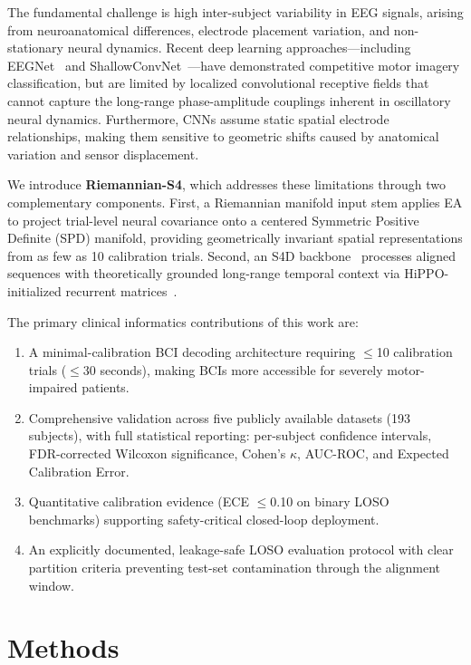 \documentclass[11pt,a4paper]{article}
\begin{document}
The fundamental challenge is high inter-subject variability in EEG signals,
arising from neuroanatomical differences, electrode placement variation, and
non-stationary neural dynamics.
Recent deep learning approaches---including EEGNet~\cite{Lawhern2018} and
ShallowConvNet~\cite{Schirrmeister2017}---have demonstrated competitive motor
imagery classification, but are limited by localized convolutional receptive
fields that cannot capture the long-range phase-amplitude couplings inherent
in oscillatory neural dynamics.
Furthermore, CNNs assume static spatial electrode relationships, making them
sensitive to geometric shifts caused by anatomical variation and sensor
displacement.

We introduce \textbf{Riemannian-S4}, which addresses these limitations through
two complementary components.
First, a Riemannian manifold input stem applies EA to project trial-level
neural covariance onto a centered Symmetric Positive Definite (SPD) manifold,
providing geometrically invariant spatial representations from as few as 10
calibration trials.
Second, an S4D backbone~\cite{Gu2022} processes aligned sequences with
theoretically grounded long-range temporal context via HiPPO-initialized
recurrent matrices~\cite{Gu2021}.

The primary clinical informatics contributions of this work are:
\begin{enumerate}
    \item A minimal-calibration BCI decoding architecture requiring $\leq$10
          calibration trials ($\leq$30 seconds), making BCIs more accessible for
          severely motor-impaired patients.
    \item Comprehensive validation across five publicly available datasets
          (193 subjects), with full statistical reporting: per-subject confidence
          intervals, FDR-corrected Wilcoxon significance, Cohen's $\kappa$,
          AUC-ROC, and Expected Calibration Error.
    \item Quantitative calibration evidence (ECE $\leq$0.10 on binary LOSO
          benchmarks) supporting safety-critical closed-loop deployment.
    \item An explicitly documented, leakage-safe LOSO evaluation protocol with
          clear partition criteria preventing test-set contamination through the
          alignment window.
\end{enumerate}

\section{Methods}
\end{document}
